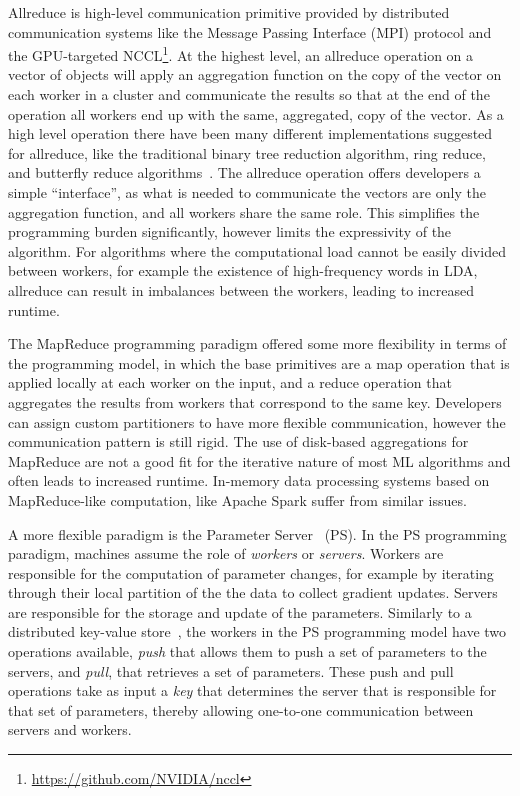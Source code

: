 Allreduce is high-level communication primitive provided by distributed communication
systems like the Message Passing Interface (MPI) protocol \cite{mpi} and the
GPU-targeted NCCL\footnote{\url{https://github.com/NVIDIA/nccl}}. At the highest
level, an allreduce operation on a vector of objects will apply an aggregation
function on the copy of the vector on each worker in a cluster and communicate
the results so that at the end of the operation all workers end up with the same,
aggregated, copy of the vector. As a high level operation there have been
many different implementations suggested for allreduce, like the traditional
binary tree reduction algorithm, ring reduce, and butterfly reduce algorithms~\cite{allreduce}.
The allreduce operation offers developers a simple ``interface'', as what is needed to communicate
the vectors are only the aggregation function, and all workers share the same role.
This simplifies the programming burden significantly, however limits the expressivity
of the algorithm. For algorithms where the computational load cannot be easily divided between
workers, for example the existence of high-frequency words in LDA\cite{lightLDA}, allreduce can result
in imbalances between the workers, leading to increased runtime\cite{straggler-ml, stale-sync-ps}.


The MapReduce programming paradigm \cite{mapreduce} offered some more flexibility in terms of the
programming model, in which the base primitives are a map operation that is applied
locally at each worker on the input, and a reduce operation that aggregates the results
from workers that correspond to the same key. Developers can assign custom partitioners
to have more flexible communication, however the communication pattern is still rigid.
The use of disk-based aggregations for MapReduce are not a good fit for the iterative
nature of most ML algorithms and often leads to increased runtime\cite{distributed-ml-design}.
In-memory data processing systems based on MapReduce-like computation, like Apache Spark \cite{spark}
suffer from similar issues.

A more flexible paradigm is the Parameter Server~\cite{muPS} (PS). In the PS programming
paradigm, machines assume the role of \emph{workers} or \emph{servers}. Workers are
responsible for the computation of parameter changes, for example by iterating through
their local partition of the the data to collect gradient updates. Servers are responsible
for the storage and update of the parameters.
Similarly to a distributed key-value store~\cite{dynamo}, the workers in the PS programming
model have two operations available, \emph{push} that allows them to push a set of
parameters to the servers, and \emph{pull}, that retrieves a set of parameters.
These push and pull operations take as input a \emph{key} that determines
the server that is responsible for that set of parameters, thereby allowing
one-to-one communication between servers and workers.


